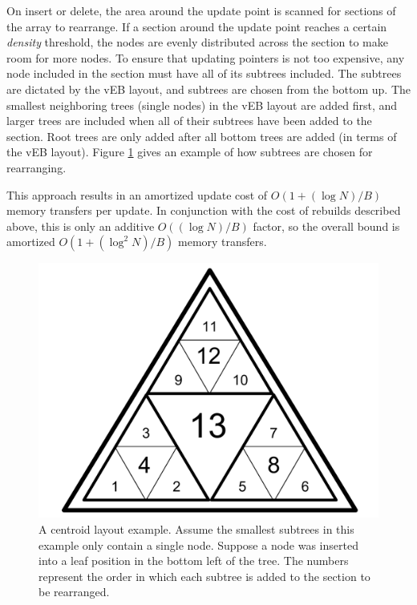 \documentclass[preprint]{style}
\begin{document}
On insert or delete, the area around the update point is scanned for sections
of the array to rearrange. If a section around the update point reaches a
certain \textit{density} threshold, the nodes are evenly distributed across the
section to make room for more nodes. To ensure that updating pointers is not too
expensive, any node included in the section must have all of its subtrees
included. The subtrees are dictated by the vEB layout, and subtrees are chosen
from the bottom up. The smallest neighboring trees (single nodes) in the vEB
layout are added first, and larger trees are included when all of their
subtrees have been added to the section. Root trees are only added after all
bottom trees are added (in terms of the vEB layout). Figure
\ref{fig:centroid_relayout} gives an example of how subtrees are chosen for
rearranging.

This approach results in an amortized update cost of $O(1+(\log{N})/B)$ memory
transfers per update. In conjunction with the cost of rebuilds described above,
this is only an additive $O((\log{N})/B)$ factor, so the overall bound is
amortized $O(1+(\log^{2}N)/B)$ memory transfers.
\begin{figure}

\begin{center}
	\includegraphics[width=0.8\columnwidth]{figures/centroidrelayoutexample.pdf}
\end{center}

\caption{A centroid layout example. Assume the smallest subtrees in this
example only contain a single node. Suppose a node was inserted into a leaf
position in the bottom left of the tree. The numbers represent the order in
which each subtree is added to the section to be rearranged.}
\label{fig:centroid_relayout}
\end{figure}
\end{document}

